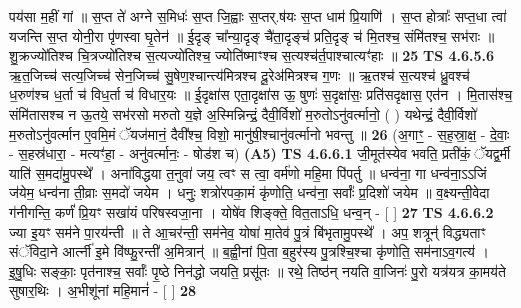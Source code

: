 \documentclass[17pt]{extarticle}
\begin{document}
                  पय॑सा म॒हीं गां ॥ स॒प्त ते॑ अग्ने स॒मिधः॑ स॒प्त जि॒ह्वाः स॒प्तर्.ष॑यः स॒प्त धाम॑ प्रि॒याणि॑ । स॒प्त होत्राः᳚ सप्त॒धा त्वा॑ यजन्ति स॒प्त योनी॒रा पृ॑णस्वा घृ॒तेन॑ ॥ ई॒दृङ् चा᳚न्या॒दृङ् चै॑ता॒दृङ्च॑ प्रति॒दृङ् च॑ मि॒तश्च॒ संमि॑तश्च॒ सभ॑राः ॥ शु॒क्रज्यो॑तिश्च चि॒त्रज्यो॑तिश्च स॒त्यज्यो॑तिश्च॒ ज्योति॑ष्माꣳश्च स॒त्यश्च॑र्त॒पाश्चात्यꣳ॑हाः ॥ \textbf{  25} \newline
                  \newline
                                \textbf{ TS 4.6.5.6} \newline
                  ऋ॒त॒जिच्च॑ सत्य॒जिच्च॑ सेन॒जिच्च॑ सु॒षेण॒श्चान्त्य॑मित्रश्च दू॒रेअ॑मित्रश्च ग॒णः ॥ ऋ॒तश्च॑ स॒त्यश्च॑ ध्रु॒वश्च॑ ध॒रुण॑श्च ध॒र्ता च॑ विध॒र्ता च॑ विधार॒यः ॥ ई॒दृक्षा॑स एता॒दृक्षा॑स ऊ॒ षुणः॑ स॒दृक्षा॑सः॒ प्रति॑सदृक्षास॒ एत॑न । मि॒तास॑श्च॒ संमि॑तासश्च न ऊ॒तये॒ सभ॑रसो मरुतो य॒ज्ञे अ॒स्मिन्निन्द्रं॒ दैवी॒र्विशो॑ म॒रुतोऽनु॑वर्त्मानो॒ ( ) यथेन्द्रं॒ दैवी॒र्विशो॑ म॒रुतोऽनु॑वर्त्मान ए॒वमि॒मं ॅयज॑मानं॒ दैवी᳚श्च॒ विशो॒ मानु॑षी॒श्चानु॑वर्त्मानो भवन्तु ॥ \textbf{  26} \newline
                  \newline
                      (अ॒गाꣳ॒॒ - स॒ह॒स्रा॒क्ष॒ - दे॒वाः॒ - स॒हस्र॑धारा॒ - मत्यꣳ॑हा॒ - अनु॑वर्त्मानः॒ - षोड॑श च)  \textbf{(A5)} \newline \newline
                                        \textbf{ TS 4.6.6.1} \newline
                  जी॒मूत॑स्येव भवति॒ प्रती॑कं॒ ॅयद्व॒र्मी याति॑ स॒मदा॑मु॒पस्थे᳚ । अना॑विद्धया त॒नुवा॑ जय॒ त्वꣳ स त्वा॒ वर्म॑णो महि॒मा पि॑पर्तु ॥ धन्व॑ना॒ गा धन्व॑ना॒ऽऽजिं ज॑येम॒ धन्व॑ना ती॒व्राः स॒मदो॑ जयेम । धनुः॒ शत्रो॑रपका॒मं कृ॑णोति॒ धन्व॑ना॒ सर्वाः᳚ प्र॒दिशो॑ जयेम ॥ व॒क्ष्यन्ती॒वेदा ग॑नीगन्ति॒ कर्णं॑ प्रि॒यꣳ सखा॑यं परिषस्वजा॒ना । योषे॑व शिङ्क्ते॒ वित॒ताऽधि॒ धन्व॒न् - [  ] \textbf{  27} \newline
                  \newline
                                \textbf{ TS 4.6.6.2} \newline
                  ज्या इ॒यꣳ सम॑ने पा॒रय॑न्ती ॥ ते आ॒चर॑न्ती॒ सम॑नेव॒ योषा॑ मा॒तेव॑ पु॒त्रं बि॑भृतामु॒पस्थे᳚ । अप॒ शत्रून्॑ विद्ध्यताꣳ संॅविदा॒ने आर्त्नी॑ इ॒मे वि॑ष्फु॒रन्ती॑ अ॒मित्रान्॑ ॥ ब॒ह्वी॒नां पि॒ता ब॒हुर॑स्य पु॒त्रश्चि॒श्चा कृ॑णोति॒ सम॑नाऽव॒गत्य॑ । इ॒षु॒धिः सङ्काः॒ पृत॑नाश्च॒ सर्वाः᳚ पृ॒ष्ठे निन॑द्धो जयति॒ प्रसू॑तः ॥ रथे॒ तिष्ठ॑न् नयति वा॒जिनः॑ पु॒रो यत्र॑यत्र का॒मय॑ते सुषार॒थिः । अ॒भीशू॑नां महि॒मानं॑ - [  ] \textbf{  28} \newline
\end{document}
